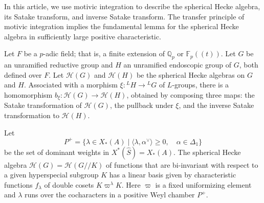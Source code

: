 
% 
% 


\newcommand{\XX}[1]{{\it  [To do: #1]}}
\newcommand{\ring}[1]{\mathbb{#1}}
\newcommand{\ang}[1]{\langle{#1}\rangle}
\def\op#1{{\operatorname{#1}}}
\def\inv{\op{inv}}
\def\dom{P^+}
\def\Q{{\ring{Q}}}
\def\card{\op{card}}
\def\CSrho{[W_S\backslash C_\rho]}

\def\C{\mathcal C}
\def\N{\mathcal N}
\def\H{\mathcal H}
\def\M{\mathcal M}
\def\T{\mathcal T}

\def\n{{\mathfrak n}}
\def\g{{\mathfrak g}}
\def\t{{\mathfrak t}}
\def\h{{\mathfrak h}}

\def\Frob{\op{Frob}}
\def\dotw{\dot w}
\def\ttau{\tilde\tau}

\def\libel#1{{\text{\sc [#1]~}}\label{#1}}
\def\rif#1{(\ref{#1}-{\text{\sc #1})}}








In this article, we use motivic integration to describe the spherical
Hecke algebra, its Satake transform, and inverse Satake transform.
The transfer principle of motivic integration implies the fundamental
lemma for the spherical Hecke algebra in sufficiently large positive characteristic.

Let $F$ be a $p$-adic field; that is, a finite extension of $\ring{Q}_p$ or $\ring{F}_p((t))$.
Let $G$ be an unramified reductive group and $H$ an unramified endoscopic group of $G$, both defined over $F$.
Let $\H(G)$ and $\H(H)$ be the spherical Hecke algebras on $G$ and $H$.
Associated with  a morphism $\xi:{}^LH\to {}^LG$ of $L$-groups, there is a homomorphism
$b_\xi:\H(G)\to \H(H)$, obtained by composing three maps: the Satake transformation of $\H(G)$,
the pullback under $\xi$, and the inverse Satake transformation to $\H(H)$.

Let 
\[
\dom = \{\lambda\in X_*(A) \mid \ang{\lambda,\alpha^\vee}\ge 0,\quad \alpha\in \Delta_1\}
\]
be the set of dominant weights in $X^*(\hat S)=X_*(A)$.
The spherical Hecke algebra $\H(G)=\H(G//K)$ of functions that are bi-invariant with respect
to a given hyperspecial subgroup $K$ has a linear basis given by characteristic functions $f_\lambda$
of double cosets $K\varpi^\lambda K$.  Here $\varpi$ is a fixed uniformizing element and $\lambda$
runs over the cocharacters in a positive Weyl chamber $P^+$.


